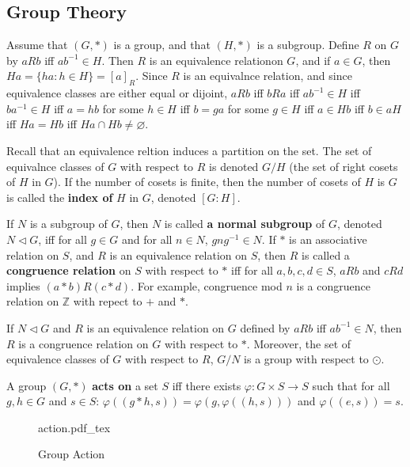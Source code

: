 \documentclass[12pt]{article}
\newcommand{\incfig}[1]{%
    \def\svgwidth{\columnwidth}
    {#1.pdf_tex}
}
\theoremstyle{definition}
\theoremstyle{definition}
\begin{document}
  \subsection{Group Theory}
    Assume that $(G, *)$ is a group, and that $(H, *)$ is a subgroup. Define $R$
    on $G$ by $aRb$ iff $ab^{-1}\in H$. Then $R$ is an equivalence relationon
    $G$, and if $a\in G$, then $Ha=\{ha:h\in H\}=[a]_R$. Since $R$ is an
    equivalnce relation, and since equivalence classes are either equal or
    dijoint, $aRb$ iff $bRa$ iff $ab^{-1}\in H$ iff $ba^{-1}\in H$ iff $a=hb$ for
    some $h\in H$ iff $b=ga$ for some $g\in H$ iff $a\in Hb$ iff $b\in aH$ iff
    $Ha=Hb$ iff $Ha\cap Hb\neq \varnothing$.\par\hspace{4mm} Recall that an
    equivalence reltion induces a partition on the set. The set of equivalnce
    classes of $G$ with respect to $R$ is denoted $G/H$ (the set of right cosets
    of $H$ in $G$). If the number of cosets is finite, then the number of cosets
    of $H$ is $G$ is called the \textbf{index of} $H$ in $G$, denoted
    $[G:H]$.\par\hspace{4mm} If $N$ is a subgroup of $G$, then $N$ is called
    \textbf{a normal subgroup} of $G$, denoted $N\triangleleft G$, iff for all
    $g\in G$ and for all $n\in N$, $gng^{-1}\in N$. If $*$ is an associative
    relation on $S$, and $R$ is an equivalence relation on $S$, then $R$ is
    called a \textbf{congruence relation} on $S$ with respect to $*$ iff for all
    $a, b, c, d\in S$, $aRb$ and $cRd$ implies $(a*b)R(c*d)$. For example,
    congruence mod $n$ is a congruence relation on $\mathbb{Z}$ with repect to
    $+$ and $*$.\par\hspace{4mm} If $N\triangleleft G$ and $R$ is an
    equivalence relation on $G$ defined by $aRb$ iff $ ab^{-1}\in N$, then $R$
    is a congruence relation on $G$ with respect to $*$. Moreover, the set of
    equivalence classes of $G$ with respect to $R$, $G/N$ is a group with
    respect to $\odot$.\par\hspace{4mm} A group $(G, *)$ \textbf{acts on} a set $S$ iff
    there exists $\varphi:G\times S \to S$ such that for all $g, h\in G$ and
    $s\in S$: $\varphi((g*h, s))=\varphi(g, \varphi((h, s)))$ and
    $\varphi((e, s))=s$.
      \begin{figure}[htp!]
        \centering
          \incfig{action}
          \caption{Group Action}
          \label{fig:action}
      \end{figure}\hfill\par\newpage
\end{document}
